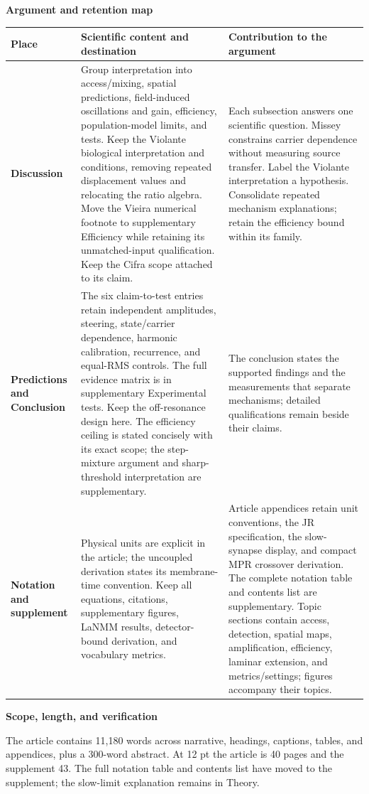 \documentclass[11pt,a4paper,landscape]{article}
\newcommand{\pagetitle}[2]{%
  {\Large\sffamily\bfseries\color{ink}#1\par}
  \vspace{2pt}{\normalsize #2\par}\vspace{5pt}}
\begin{document}
\newpage
\pagetitle{Argument and retention map}{Section order in the revised article and supplement}
\begin{tabularx}{\textwidth}{@{}L{43mm}YY@{}}
\toprule
\textbf{Place} & \textbf{Scientific content and destination} & \textbf{Contribution to the argument}\\
\midrule
\textbf{Discussion} & Group interpretation into access/mixing, spatial predictions, field-induced oscillations and gain, efficiency, population-model limits, and tests. Keep the Violante biological interpretation and conditions, removing repeated displacement values and relocating the ratio algebra. Move the Vieira numerical footnote to supplementary Efficiency while retaining its unmatched-input qualification. Keep the Cifra scope attached to its claim. & Each subsection answers one scientific question. Missey constrains carrier dependence without measuring source transfer. Label the Violante interpretation a hypothesis. Consolidate repeated mechanism explanations; retain the efficiency bound within its family.\\[8pt]
\textbf{Predictions and Conclusion} & The six claim-to-test entries retain independent amplitudes, steering, state/carrier dependence, harmonic calibration, recurrence, and equal-RMS controls. The full evidence matrix is in supplementary Experimental tests. Keep the off-resonance design here. The efficiency ceiling is stated concisely with its exact scope; the step-mixture argument and sharp-threshold interpretation are supplementary. & The conclusion states the supported findings and the measurements that separate mechanisms; detailed qualifications remain beside their claims.\\[8pt]
\textbf{Notation and supplement} & Physical units are explicit in the article; the uncoupled derivation states its membrane-time convention. Keep all equations, citations, supplementary figures, LaNMM results, detector-bound derivation, and vocabulary metrics. & Article appendices retain unit conventions, the JR specification, the slow-synapse display, and compact MPR crossover derivation. The complete notation table and contents list are supplementary. Topic sections contain access, detection, spatial maps, amplification, efficiency, laminar extension, and metrics/settings; figures accompany their topics.\\[8pt]
\bottomrule\end{tabularx}
\newpage
\pagetitle{Scope, length, and verification}{November 24: approved submission-review corrections}
The article contains 11,180 words across narrative, headings, captions,
tables, and appendices, plus a 300-word abstract. At 12 pt the article is
40 pages and the supplement 43. The full notation table and contents list
have moved to the supplement; the slow-limit explanation remains in Theory.
\end{document}
